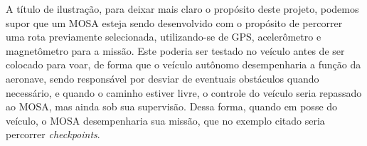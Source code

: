 A título de ilustração, para deixar mais claro o propósito deste projeto, podemos
supor que um MOSA esteja sendo desenvolvido com o propósito de percorrer uma rota
previamente selecionada, utilizando-se de GPS, acelerômetro e magnetômetro para a
missão. Este poderia ser testado no veículo antes de ser colocado para voar, de forma que
o veículo autônomo desempenharia a função da aeronave, sendo responsável por desviar
de eventuais obstáculos quando necessário, e quando o caminho estiver livre, o controle
do veículo seria repassado ao MOSA, mas ainda sob sua supervisão. Dessa forma, quando
em posse do veículo, o MOSA desempenharia sua missão, que no exemplo citado seria
percorrer \textit{checkpoints}.
